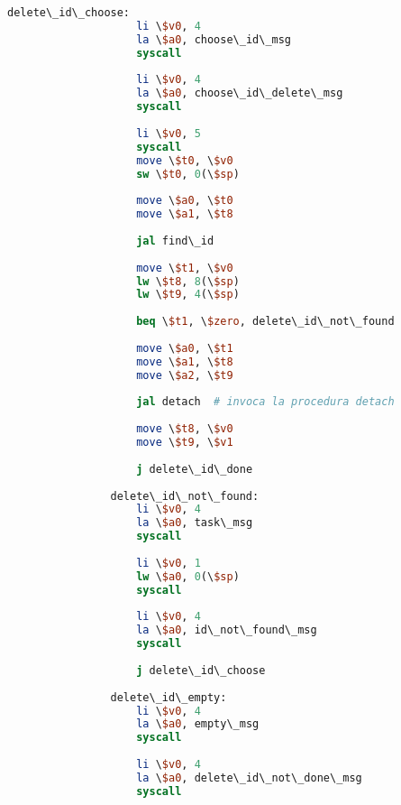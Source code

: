 \begin{center}
\begin{lstlisting}[language=mips, gobble=14, stepnumber=1]
                delete\_id\_choose:
                    li \$v0, 4
                    la \$a0, choose\_id\_msg
                    syscall
                    
                    li \$v0, 4
                    la \$a0, choose\_id\_delete\_msg
                    syscall
                    
                    li \$v0, 5
                    syscall
                    move \$t0, \$v0
                    sw \$t0, 0(\$sp)
                    
                    move \$a0, \$t0
                    move \$a1, \$t8
                    
                    jal find\_id
                    
                    move \$t1, \$v0
                    lw \$t8, 8(\$sp)
                    lw \$t9, 4(\$sp)
                    
                    beq \$t1, \$zero, delete\_id\_not\_found
                
                    move \$a0, \$t1
                    move \$a1, \$t8
                    move \$a2, \$t9
                    
                    jal detach  # invoca la procedura detach
                    
                    move \$t8, \$v0
                    move \$t9, \$v1
                    
                    j delete\_id\_done
                
                delete\_id\_not\_found:
                    li \$v0, 4
                    la \$a0, task\_msg
                    syscall
                    
                    li \$v0, 1
                    lw \$a0, 0(\$sp)
                    syscall
                    
                    li \$v0, 4
                    la \$a0, id\_not\_found\_msg
                    syscall
                    
                    j delete\_id\_choose
                    
                delete\_id\_empty:
                    li \$v0, 4
                    la \$a0, empty\_msg
                    syscall
                    
                    li \$v0, 4
                    la \$a0, delete\_id\_not\_done\_msg
                    syscall
                    

\end{lstlisting}
\end{center}
